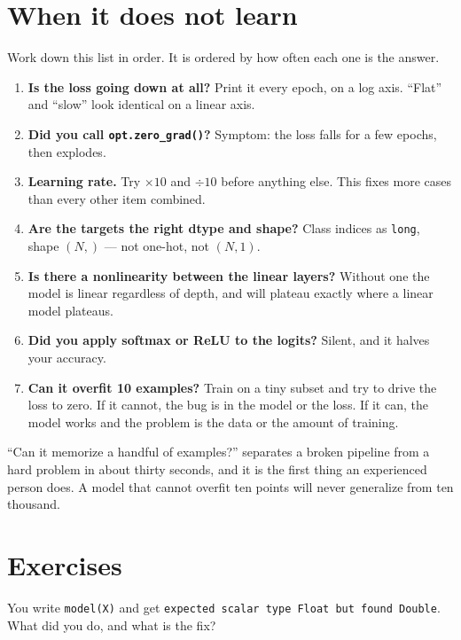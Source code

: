 \documentclass[11pt]{article}
\begin{document}
\section{When it does not learn}

Work down this list in order. It is ordered by how often each one is the answer.

\begin{enumerate}
  \item \textbf{Is the loss going down at all?} Print it every epoch, on a log
        axis. ``Flat'' and ``slow'' look identical on a linear axis.
  \item \textbf{Did you call \texttt{opt.zero\_grad()}?} Symptom: the loss falls
        for a few epochs, then explodes.
  \item \textbf{Learning rate.} Try $\times 10$ and $\div 10$ before anything
        else. This fixes more cases than every other item combined.
  \item \textbf{Are the targets the right dtype and shape?} Class indices as
        \texttt{long}, shape $(N,)$ --- not one-hot, not $(N,1)$.
  \item \textbf{Is there a nonlinearity between the linear layers?} Without one
        the model is linear regardless of depth, and will plateau exactly where
        a linear model plateaus.
  \item \textbf{Did you apply softmax or ReLU to the logits?} Silent, and it
        halves your accuracy.
  \item \textbf{Can it overfit 10 examples?} Train on a tiny subset and try to
        drive the loss to zero. If it cannot, the bug is in the model or the
        loss. If it can, the model works and the problem is the data or the
        amount of training.
\end{enumerate}

\begin{keybox}
 ``Can it memorize a handful of examples?''
separates a broken pipeline from a hard problem in about thirty seconds, and it
is the first thing an experienced person does. A model that cannot overfit ten
points will never generalize from ten thousand.
\end{keybox}

\section{Exercises}

 You write \texttt{model(X)} and get \texttt{expected scalar type Float
but found Double}. What did you do, and what is the fix?
\end{document}
